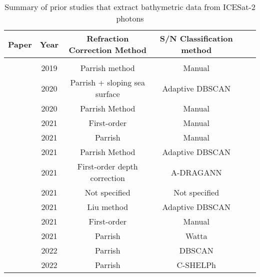 \begin{table}[h]
      \caption{Summary of prior studies that extract bathymetric data from ICESat-2 photons}
      \label{tab:researchsummary}
      \raggedright
      \begin{tabular}{rccccc}
            \midrule
            Paper                        & Year & Refraction Correction Method  & S/N Classification method \\
            \hline                                                                                          \\
            \citeauthor{Parrish2019}     & 2019 & Parrish method                & Manual                    \\
            \citeauthor{Ma2020}          & 2020 & Parrish + sloping sea surface & Adaptive DBSCAN           \\
            \citeauthor{Thomas2021d}     & 2020 & Parrish Method                & Manual                    \\
            \citeauthor{Albright2021}    & 2021 & First-order                   & Manual                    \\
            \citeauthor{Babbel2021a}     & 2021 & Parrish                       & Manual                    \\
            \citeauthor{Xie2021}         & 2021 & Parrish Method                & Adaptive DBSCAN           \\
            \citeauthor{Cao2021}         & 2021 & First-order depth correction  & A-DRAGANN                 \\
            \citeauthor{Lee2021}         & 2021 & Not specified                 & Not specified             \\
            \citeauthor{Liu2021}         & 2021 & Liu method                    & Adaptive DBSCAN    \\
            \citeauthor{Coveney2021a}    & 2021 & First-order                   & Manual                    \\
            \citeauthor{Datta2021}       & 2021 & Parrish                       & Watta                     \\
            \citeauthor{LeQuilleuc2022b} & 2022 & Parrish                       & DBSCAN                    \\
            \citeauthor{Thomas2022}      & 2022 & Parrish                       & C-SHELPh                  \\
            \bottomrule
      \end{tabular}
\end{table}


